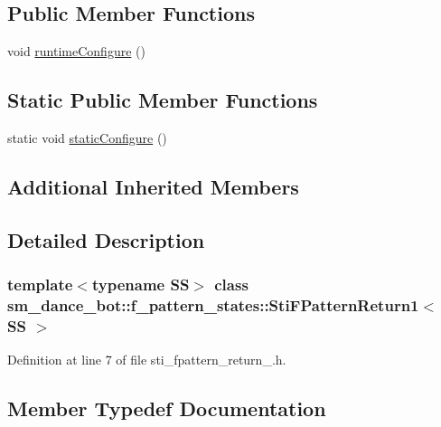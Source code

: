 \subsection*{Public Member Functions}
\begin{DoxyCompactItemize}
\item 
void \hyperlink{structsm__dance__bot_1_1f__pattern__states_1_1StiFPatternReturn1_a888586201a9711546bbd53521d7b72ce}{runtime\+Configure} ()
\end{DoxyCompactItemize}
\subsection*{Static Public Member Functions}
\begin{DoxyCompactItemize}
\item 
static void \hyperlink{structsm__dance__bot_1_1f__pattern__states_1_1StiFPatternReturn1_a8dc2319ebc743b31189067897a9ace78}{static\+Configure} ()
\end{DoxyCompactItemize}
\subsection*{Additional Inherited Members}


\subsection{Detailed Description}
\subsubsection*{template$<$typename SS$>$\newline
class sm\+\_\+dance\+\_\+bot\+::f\+\_\+pattern\+\_\+states\+::\+Sti\+F\+Pattern\+Return1$<$ S\+S $>$}



Definition at line 7 of file sti\+\_\+fpattern\+\_\+return\+\_.\+h.



\subsection{Member Typedef Documentation}
\mbox{\label{structsm__dance__bot_1_1f__pattern__states_1_1StiFPatternReturn1_a2fcaf186ce44b90735584e304831f944}} 

